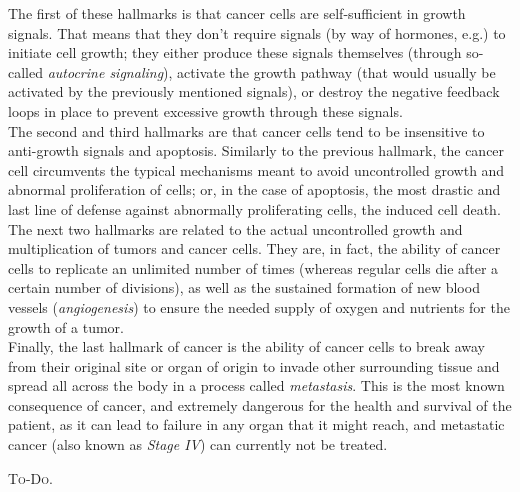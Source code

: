 The first of these hallmarks is that cancer cells are self-sufficient in growth signals. That means that they don't require signals (by way of hormones, e.g.) to initiate cell growth; they either produce these signals themselves (through so-called \textit{autocrine signaling}), activate the growth pathway (that would usually be activated by the previously mentioned signals), or destroy the negative feedback loops in place to prevent excessive growth through these signals.\\
The second and third hallmarks are that cancer cells tend to be insensitive to anti-growth signals and apoptosis. Similarly to the previous hallmark, the cancer cell circumvents the typical mechanisms meant to avoid uncontrolled growth and abnormal proliferation of cells; or, in the case of apoptosis, the most drastic and last line of defense against abnormally proliferating cells, the induced cell death.\\
The next two hallmarks are related to the actual uncontrolled growth and multiplication of tumors and cancer cells. They are, in fact, the ability of cancer cells to replicate an unlimited number of times (whereas regular cells die after a certain number of divisions), as well as the sustained formation of new blood vessels (\textit{angiogenesis}) to ensure the needed supply of oxygen and nutrients for the growth of a tumor.\\
Finally, the last hallmark of cancer is the ability of cancer cells to break away from their original site or organ of origin to invade other surrounding tissue and spread all across the body in a process called \textit{metastasis}. This is the most known consequence of cancer, and extremely dangerous for the health and survival of the patient, as it can lead to failure in any organ that it might reach, and metastatic cancer (also known as \textit{Stage IV}) can currently not be treated.

\textsc{To-Do.}